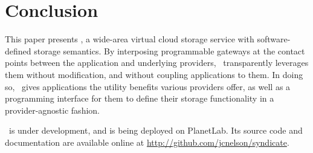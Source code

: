 \section{Conclusion}
\label{sec:conclusion}

This paper presents \Syndicate, a wide-area virtual cloud storage
service with software-defined storage semantics.  By interposing
programmable gateways at the contact points between the application
and underlying providers, \Syndicate\ transparently leverages them
without modification, and without coupling applications to them.  In
doing so, \Syndicate\ gives applications the utility benefits various
providers offer, as well as a programming interface for them to define
their storage functionality in a provider-agnostic fashion.

\Syndicate\ is under development, and is being deployed on PlanetLab.
Its source code and documentation are available online at
\url{http://github.com/jcnelson/syndicate}.
